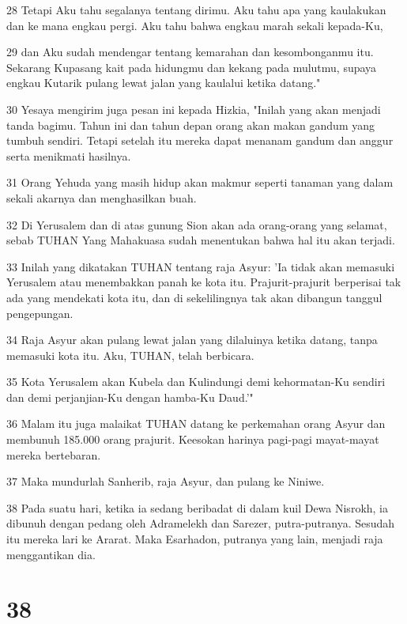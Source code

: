 \par 28 Tetapi Aku tahu segalanya tentang dirimu. Aku tahu apa yang kaulakukan dan ke mana engkau pergi. Aku tahu bahwa engkau marah sekali kepada-Ku,
\par 29 dan Aku sudah mendengar tentang kemarahan dan kesombonganmu itu. Sekarang Kupasang kait pada hidungmu dan kekang pada mulutmu, supaya engkau Kutarik pulang lewat jalan yang kaulalui ketika datang."
\par 30 Yesaya mengirim juga pesan ini kepada Hizkia, "Inilah yang akan menjadi tanda bagimu. Tahun ini dan tahun depan orang akan makan gandum yang tumbuh sendiri. Tetapi setelah itu mereka dapat menanam gandum dan anggur serta menikmati hasilnya.
\par 31 Orang Yehuda yang masih hidup akan makmur seperti tanaman yang dalam sekali akarnya dan menghasilkan buah.
\par 32 Di Yerusalem dan di atas gunung Sion akan ada orang-orang yang selamat, sebab TUHAN Yang Mahakuasa sudah menentukan bahwa hal itu akan terjadi.
\par 33 Inilah yang dikatakan TUHAN tentang raja Asyur: 'Ia tidak akan memasuki Yerusalem atau menembakkan panah ke kota itu. Prajurit-prajurit berperisai tak ada yang mendekati kota itu, dan di sekelilingnya tak akan dibangun tanggul pengepungan.
\par 34 Raja Asyur akan pulang lewat jalan yang dilaluinya ketika datang, tanpa memasuki kota itu. Aku, TUHAN, telah berbicara.
\par 35 Kota Yerusalem akan Kubela dan Kulindungi demi kehormatan-Ku sendiri dan demi perjanjian-Ku dengan hamba-Ku Daud.'"
\par 36 Malam itu juga malaikat TUHAN datang ke perkemahan orang Asyur dan membunuh 185.000 orang prajurit. Keesokan harinya pagi-pagi mayat-mayat mereka bertebaran.
\par 37 Maka mundurlah Sanherib, raja Asyur, dan pulang ke Niniwe.
\par 38 Pada suatu hari, ketika ia sedang beribadat di dalam kuil Dewa Nisrokh, ia dibunuh dengan pedang oleh Adramelekh dan Sarezer, putra-putranya. Sesudah itu mereka lari ke Ararat. Maka Esarhadon, putranya yang lain, menjadi raja menggantikan dia.

\chapter{38}

